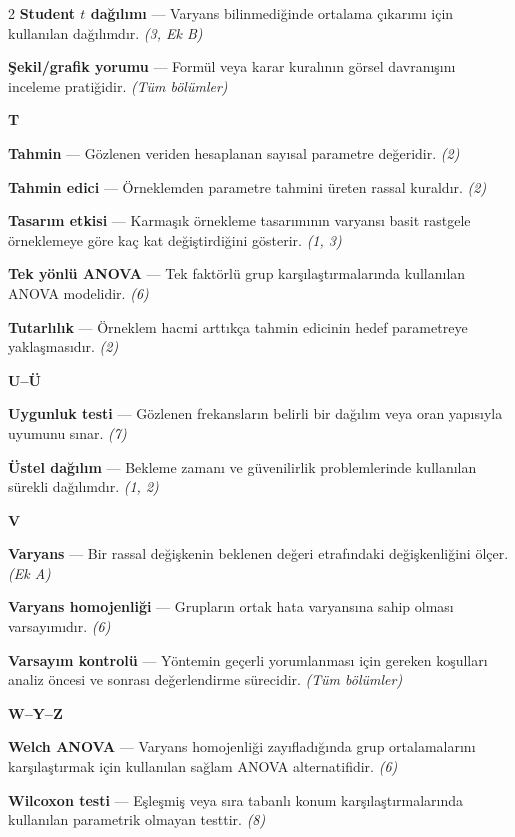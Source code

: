 \begin{multicols}{2}
\textbf{Student $t$ dağılımı} --- Varyans bilinmediğinde ortalama çıkarımı için kullanılan dağılımdır. \emph{(3, Ek B)}\par
\textbf{Şekil/grafik yorumu} --- Formül veya karar kuralının görsel davranışını inceleme pratiğidir. \emph{(Tüm bölümler)}\par
\medskip
\noindent\textbf{\large T}\par\smallskip
\textbf{Tahmin} --- Gözlenen veriden hesaplanan sayısal parametre değeridir. \emph{(2)}\par
\textbf{Tahmin edici} --- Örneklemden parametre tahmini üreten rassal kuraldır. \emph{(2)}\par
\textbf{Tasarım etkisi} --- Karmaşık örnekleme tasarımının varyansı basit rastgele örneklemeye göre kaç kat değiştirdiğini gösterir. \emph{(1, 3)}\par
\textbf{Tek yönlü ANOVA} --- Tek faktörlü grup karşılaştırmalarında kullanılan ANOVA modelidir. \emph{(6)}\par
\textbf{Tutarlılık} --- Örneklem hacmi arttıkça tahmin edicinin hedef parametreye yaklaşmasıdır. \emph{(2)}\par
\medskip
\noindent\textbf{\large U--Ü}\par\smallskip
\textbf{Uygunluk testi} --- Gözlenen frekansların belirli bir dağılım veya oran yapısıyla uyumunu sınar. \emph{(7)}\par
\textbf{Üstel dağılım} --- Bekleme zamanı ve güvenilirlik problemlerinde kullanılan sürekli dağılımdır. \emph{(1, 2)}\par
\medskip
\noindent\textbf{\large V}\par\smallskip
\textbf{Varyans} --- Bir rassal değişkenin beklenen değeri etrafındaki değişkenliğini ölçer. \emph{(Ek A)}\par
\textbf{Varyans homojenliği} --- Grupların ortak hata varyansına sahip olması varsayımıdır. \emph{(6)}\par
\textbf{Varsayım kontrolü} --- Yöntemin geçerli yorumlanması için gereken koşulları analiz öncesi ve sonrası değerlendirme sürecidir. \emph{(Tüm bölümler)}\par
\medskip
\noindent\textbf{\large W--Y--Z}\par\smallskip
\textbf{Welch ANOVA} --- Varyans homojenliği zayıfladığında grup ortalamalarını karşılaştırmak için kullanılan sağlam ANOVA alternatifidir. \emph{(6)}\par
\textbf{Wilcoxon testi} --- Eşleşmiş veya sıra tabanlı konum karşılaştırmalarında kullanılan parametrik olmayan testtir. \emph{(8)}\par

\end{multicols}

